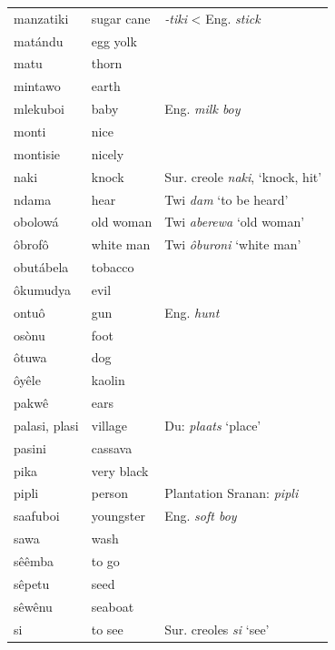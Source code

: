 \begin{longtable}[c]{ p{} p{} p{} }
    manzatiki       & sugar cane    & \textit{-tiki} < Eng. \textit{stick}  \\
    matándu         & egg yolk      &  \\
    matu            & thorn         &  \\
    mintawo         & earth         &  \\
    mlekuboi        & baby          & Eng. \textit{milk boy}  \\
    monti           & nice          &  \\
    montisie        & nicely        &  \\
    naki            & knock         & Sur. creole \textit{naki}, `knock, hit'  \\
    ndama           & hear          & Twi \textit{dam} `to be heard'  \\
    obolowá         & old woman     & Twi \textit{aberewa} `old woman'  \\
    ôbrofô          & white man     & Twi \textit{ôburoni} `white man'  \\
    obutábela       & tobacco       &  \\
    ôkumudya        & evil          &  \\
    ontuô           & gun           & Eng. \textit{hunt}  \\
    osònu           & foot          &  \\
    ôtuwa           & dog           &  \\
    ôyêle           & kaolin        &  \\
    pakwê           & ears          &  \\
    palasi, plasi   & village       &  Du: \textit{plaats} `place'  \\
    pasini          & cassava       &  \\
    pika            & very black    &  \\
    pipli           & person        & Plantation Sranan: \textit{pipli}  \\
    saafuboi        & youngster     & Eng. \textit{soft boy}  \\
    sawa            & wash          &  \\
    sêêmba          & to go         &  \\
    sêpetu          & seed          &  \\
    sêwênu          & seaboat       &  \\
    si              & to see        & Sur. creoles \textit{si} `see'  \\

\end{longtable}
